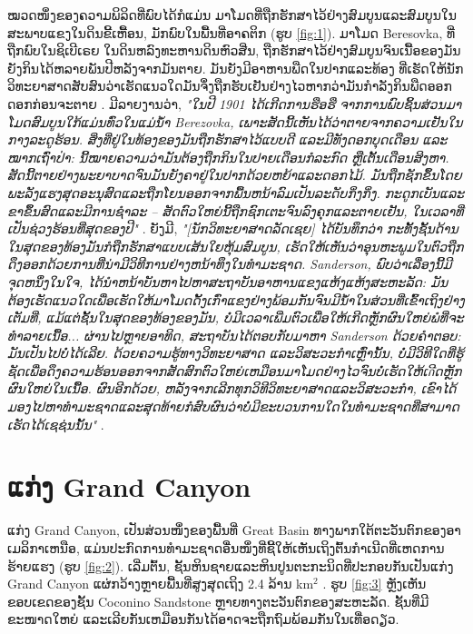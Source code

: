 \documentclass[10pt,twocolumn,letterpaper]{article}
\begin{document}
ໝວດໜຶ່ງຂອງຄວາມພິລິດທີ່ພົບໄດ້ກໍແມ່ນ ມາໂມດທີ່ຖືກຮັກສາໄວ້ຢ່າງສົມບູນແລະສົມບູນໃນສະພາບແຂງໃນດິນຂີ້ເຫື້ອນ, ມັກພົບໃນພື້ນທີ່ອາຄຕິກ (ຮູບ \ref{fig:1}). ມາໂມດ Beresovka, ທີ່ຖືກພົບໃນຊິເບີເຣຍ ໃນດິນຫລົງທະຫານດິນຫົວສີ່ນ, ຖືກຮັກສາໄວ້ຢ່າງສົມບູນຈົນເນື້ອຂອງມັນຍັງກິນໄດ້ຫລາຍພັນປີຫລັງຈາກມັນຕາຍ. ມັນຍັງມີອາຫານພືດໃນປາກແລະທ້ອງ ທີ່ເຮັດໃຫ້ນັກວິທະຍາສາດສັບສົນວ່າເຮັດແນວໃດມັນຈຶ່ງຖືກຮັບເຢັນຢ່າງໄວຫາກວ່າມັນກຳລັງກິນພືດອອກດອກກ່ອນຈະຕາຍ \cite{17}. ມີລາຍງານວ່າ, \textit{"ໃນປີ 1901 ໄດ້ເກີດການຮືອຮື ຈາກການພົບຊິ້ນສ່ວນມາໂມດສົມບູນໃກ້ແມ່ນທົ່ວໃນແມ່ນໍ້າ Berezovka, ເພາະສັດນີ້ເຫັນໄດ້ວ່າຕາຍຈາກຄວາມເຢັນໃນກາງລະດູຮ້ອນ. ສິ່ງທີ່ຢູ່ໃນທ້ອງຂອງມັນຖືກຮັກສາໄວ້ແບບດີ ແລະມີທັງດອກບຸດເດືອນ ແລະໝາກເຖົ່າປ່າ: ນີ້ໝາຍຄວາມວ່າມັນຕ້ອງຖືກກິນໃນປາຍເດືອນກໍລະກົດ ຫຼືເຕັ້ນເດືອນສິງຫາ. ສັດນີ້ຕາຍຢ່າງພະຍາບາດຈົນມັນຍັງຄາຢູ່ໃນປາກດ້ວຍຫຍ້າແລະດອກໄມ້. ມັນຖືກຊັກຂຶ້ນໂດຍພະລັງແຮງສຸດອະນຸສົດແລະຖືກໂຍນອອກຈາກພື້ນຫນ້າລົມເປັນລະດັບກິ່ງກິ່ງ. ກະດູກເບັນແລະຂາຂຶ້ນສົດແລະມີການຊຳລະ – ສັດຕົວໃຫຍ່ນີ້ຖືກຊົກເຕະຈົນລົງຄຸກແລະຕາຍເຢັນ, ໃນເວລາທີ່ເປັນຊ່ວງຮ້ອນທີ່ສຸດຂອງປີ"} \cite{18}. ຍັງມີ, \textit{"[ນັກວິທະຍາສາດລັດເຊຍ] ໄດ້ບັນທຶກວ່າ ກະທັ້ງຊັ້ນດ້ານໃນສຸດຂອງທ້ອງມັນກໍຖືກຮັກສາແບບເສ້ນໃຍຫຸ້ມສົມບູນ, ເຮັດໃຫ້ເຫັນວ່າອຸນຫະພູມໃນຕົວຖືກດຶງອອກດ້ວຍການທີ່ນ່າມີວິທີການຢ່າງຫນ້າທຶງໃນທໍາມະຊາດ. Sanderson, ພົບວ່າເລື່ອງນີ້ມີຈຸດຫນຶ່ງໃນໃຈ, ໄດ້ນໍາຫນ້າບັນຫາໄປຫາສະຖາບັນອາຫານແຂງແຫ້ງແຫ້ງສະຫະລັດ: ມັນຕ້ອງເຮັດແນວໃດເພື່ອເຮັດໃຫ້ມາໂມດດັ້ງເກົ່າແຂງຢ່າງພ້ອມກັນຈົນມີນ້ຳໃນສ່ວນທີ່ເຂົ້າເຖິງຢ່າງເຕັມທີ່, ແມ້ແຕ່ຊັ້ນໃນສຸດຂອງທ້ອງຂອງມັນ, ບໍ່ມີເວລາເພີ່ມຕົວເພື່ອໃຫ້ເກີດຫຼັກຜົນໃຫຍ່ພໍທີ່ຈະທໍາລາຍເນື້ອ... ຜ່ານໄປຫຼາຍອາທິດ, ສະຖາບັນໄດ້ຕອບກັບມາຫາ Sanderson ດ້ວຍຄໍາຕອບ: ມັນເປັນໄປບໍ່ໄດ້ເລີຍ. ດ້ວຍຄວາມຮູ້ທາງວິທະຍາສາດ ແລະວິສະວະກຳເຫຼົ່ານັ້ນ, ບໍ່ມີວິທີໃດທີ່ຮູ້ຊັດເພື່ອດຶງຄວາມຮ້ອນອອກຈາກສັດສົກຕົວໃຫຍ່ເຫມືອນມາໂມດຢ່າງໄວຈົນບໍ່ເຮັດໃຫ້ເกີດຫຼັກຜົນໃຫຍ່ໃນເນື້ອ. ຜົນອີກດ້ວຍ, ຫລັງຈາກເລີກທຸກວິທີວິທະຍາສາດແລະວິສະວະກຳ, ເຂົາໄດ້ມອງໄປຫາທໍາມະຊາດແລະສຸດທ້າຍກໍສົບຜົນວ່າບໍ່ມີຂະບວນການໃດໃນທໍາມະຊາດທີ່ສາມາດເຮັດໄດ້ເຊຊ່ນນັ້ນ"} \cite{19}.

\section{ແກ່ງ Grand Canyon}

ແກ່ງ Grand Canyon, ເປັນສ່ວນໜຶ່ງຂອງພື້ນທີ່ Great Basin ທາງພາກໃຕ້ຕະວັນຕົກຂອງອາເມລິກາເຫນືອ, ແມ່ນປະກົດການທຳມະຊາດອື່ນໜຶ່ງທີ່ຊີ້ໃຫ້ເຫັນເຖິງຕົ້ນກຳເນີດທີ່ເຫດການຮ້າຍແຮງ (ຮູບ \ref{fig:2}). ເລີ່ມຕົ້ນ, ຊັ້ນຫິນຊາຍແລະຫິນປູນຕະກະນິດທີ່ປະກອບກັນເປັນແກ່ງ Grand Canyon ແຜ່ກວ້າງຫຼາຍພື້ນທີ່ສູງສຸດເຖິງ 2.4 ລ້ານ km$^2$ \cite{21}. ຮູບ \ref{fig:3} ຫຼັງເຫັນຂອບເຂດຂອງຊັ້ນ Coconino Sandstone ຫຼາຍທາງຕະວັນຕົກຂອງສະຫະລັດ. ຊັ້ນທີ່ມີຂະໜາດໃຫຍ່ ແລະເລີຍກັນເຫມືອນກັນໄດ້ອາດຈະຖືກຖົມພ້ອມກັນໃນເທື່ອດຽວ.
\end{document}
